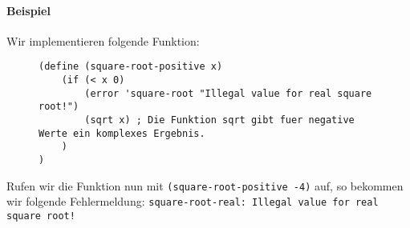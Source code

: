	\paragraph{Beispiel}
		Wir implementieren folgende Funktion:
		\begin{figure}[H]
			\centering
			\begin{lstlisting}[language = Racket]
(define (square-root-positive x)
	(if (< x 0)
		(error 'square-root "Illegal value for real square root!")
		(sqrt x) ; Die Funktion sqrt gibt fuer negative Werte ein komplexes Ergebnis.
	)
)
			\end{lstlisting}
		\end{figure}
	
		Rufen wir die Funktion nun mit \lstinline[language = Racket]|(square-root-positive -4)| auf, so bekommen wir folgende Fehlermeldung: \texttt{square-root-real: Illegal value for real square root!}
